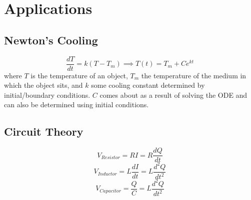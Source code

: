 \documentclass[10pt,landscape,letterpaper]{cheatsheet}
\begin{document}
\section*{Applications}
\subsection*{Newton's Cooling}
$$\frac{dT}{dt}=k(T-T_m)\implies T(t)=T_m+Ce^{kt}$$ where $T$ is the temperature of an object, $T_m$ the temperature of the medium in which the object sits, and $k$ some cooling constant determined by initial/boundary conditions.
$C$ comes about as a result of solving the ODE and can also be determined using initial conditions.
\subsection*{Circuit Theory}
$$V_{Resistor}=RI=R\frac{dQ}{dt}$$
$$V_{Inductor}=L\frac{dI}{dt}=L\frac{d^2Q}{dt^2}$$
$$V_{Capacitor}=\frac{Q}{C}=L\frac{d^2Q}{dt^2}$$
\end{document}
